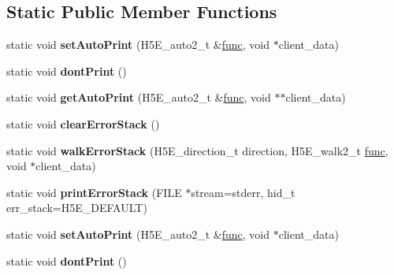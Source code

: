 \subsection*{Static Public Member Functions}
\begin{DoxyCompactItemize}
\item 
\mbox{\label{class_h5_1_1_exception_aaa5eced658f7bb8443672f113da3540e}} 
static void {\bfseries set\+Auto\+Print} (H5\+E\+\_\+auto2\+\_\+t \&\hyperlink{structfunc}{func}, void $\ast$client\+\_\+data)
\item 
\mbox{\label{class_h5_1_1_exception_a005d870763c71789ae8028eae01dc50b}} 
static void {\bfseries dont\+Print} ()
\item 
\mbox{\label{class_h5_1_1_exception_a6463493e0003665c736730cead998d67}} 
static void {\bfseries get\+Auto\+Print} (H5\+E\+\_\+auto2\+\_\+t \&\hyperlink{structfunc}{func}, void $\ast$$\ast$client\+\_\+data)
\item 
\mbox{\label{class_h5_1_1_exception_a12d28182bcd0764dcf6c83aaece22b3a}} 
static void {\bfseries clear\+Error\+Stack} ()
\item 
\mbox{\label{class_h5_1_1_exception_a72d38d93a51e449c95ce41563a2925ee}} 
static void {\bfseries walk\+Error\+Stack} (H5\+E\+\_\+direction\+\_\+t direction, H5\+E\+\_\+walk2\+\_\+t \hyperlink{structfunc}{func}, void $\ast$client\+\_\+data)
\item 
\mbox{\label{class_h5_1_1_exception_aba48faf9cbbaa3a169c6869fae0aed04}} 
static void {\bfseries print\+Error\+Stack} (F\+I\+LE $\ast$stream=stderr, hid\+\_\+t err\+\_\+stack=H5\+E\+\_\+\+D\+E\+F\+A\+U\+LT)
\item 
\mbox{\label{class_h5_1_1_exception_aaa5eced658f7bb8443672f113da3540e}} 
static void {\bfseries set\+Auto\+Print} (H5\+E\+\_\+auto2\+\_\+t \&\hyperlink{structfunc}{func}, void $\ast$client\+\_\+data)
\item 
\mbox{\label{class_h5_1_1_exception_a005d870763c71789ae8028eae01dc50b}} 
static void {\bfseries dont\+Print} ()
$$
\end{DoxyCompactItemize}
